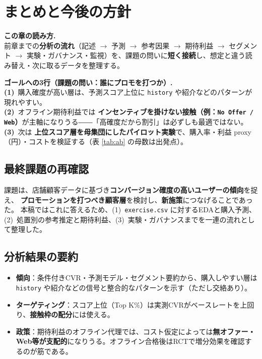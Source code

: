 \documentclass[11pt,a4paper]{article}
\begin{document}
\FloatBarrier
\section{まとめと今後の方針}
\label{sec:conclusion_wrap}

\noindent\textbf{この章の読み方.}\\
前章までの\textbf{分析の流れ}（記述 $\rightarrow$ 予測 $\rightarrow$ 参考因果 $\rightarrow$ 期待利益 $\rightarrow$ セグメント $\rightarrow$ 実験・ガバナンス・監視）を、課題の問いに\textbf{短く接続}し、想定と違う読み替え・次に取るデータを整理する。

\noindent\textbf{ゴールへの3行（課題の問い：誰にプロモを打つか）.}\\
\textbf{(1)}~購入確度が高い層は、予測スコア上位に \texttt{history} や紹介などのパターンが現れやすい。\\
\textbf{(2)}~オフライン期待利益では \textbf{インセンティブを掛けない接触（例：\texttt{No Offer / Web}）}が主軸になりうる――「高確度だから割引」は必ずしも最適ではない。\\
\textbf{(3)}~次は \textbf{上位スコア層を母集団にしたパイロット実験}で、購入率・利益 proxy（円）・コストを検証する（表 \ref{tab:ab} の母数は出発点）。\\

\subsection{最終課題の再確認}
課題は、店舗顧客データに基づき\textbf{コンバージョン確度の高いユーザーの傾向}を捉え、
\textbf{プロモーションを打つべき顧客層}を検討し、\textbf{新施策}につなげることであった。
本稿ではこれに答えるため、(1)~\texttt{exercise.csv} に対するEDAと購入予測、(2)~処置別の参考推定と期待利益、(3)~実験・ガバナンスまでを一連の流れとして整理した。

\subsection{分析結果の要約}
\begin{itemize}
  \item \textbf{傾向}：条件付きCVR・予測モデル・セグメント要約から、購入しやすい層は \texttt{history} や紹介などの信号と整合的なパターンを示す（ただし交絡あり）。
  \item \textbf{ターゲティング}：スコア上位（Top K\%）は実測CVRがベースレートを上回り、\textbf{接触枠の配分}には使える。
  \item \textbf{政策}：期待利益のオフライン代理では、コスト仮定によっては\textbf{無オファー・Web等が支配的}になりうる。オフライン合格後はRCTで増分効果を確認するのが筋である。
\end{itemize}
\end{document}
